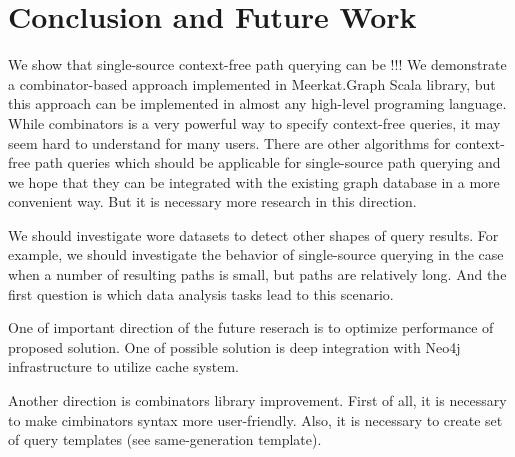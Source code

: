 \section{Conclusion and Future Work}

We show that single-source context-free path querying can be !!!
We demonstrate a combinator-based approach implemented in Meerkat.Graph Scala library, but this approach can be implemented in almost any high-level programing language.
While combinators  is a very powerful way to specify context-free queries, it may seem hard to understand for many users.
There are other algorithms for context-free path queries which should be applicable for single-source path querying and we hope that they can be integrated with the existing graph database in a more convenient way.
But it is necessary more research in this direction.

We should investigate wore datasets to detect other shapes of query results.
For example, we should investigate the behavior of single-source querying in the case when a number of resulting paths is small, but paths are relatively long.
And the first question is which data analysis tasks lead to this scenario.

One of important direction of the future reserach is to optimize performance of proposed solution.
One of possible solution is deep integration with Neo4j infrastructure to utilize cache system.

Another direction is combinators library improvement.
First of all, it is necessary to make cimbinators syntax more user-friendly.
Also, it is necessary to create set of query templates (see same-generation template).
